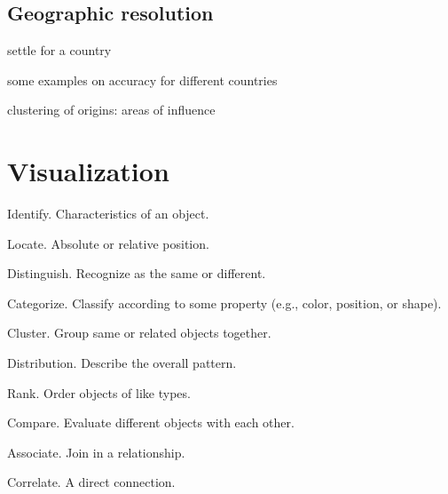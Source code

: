 

\subsection{Geographic resolution}\label{sub:resolution}

\begin{todos}
    \item settle for a country
    \item some examples on accuracy for different countries
    \item clustering of origins: areas of influence
\end{todos}


\section{Visualization}\label{sec:visualization}



\begin{todos}
    \item {}
    \item Identify. Characteristics of an object.
    \item Locate. Absolute or relative position.
    \item Distinguish. Recognize as the same or different.
    \item Categorize. Classify according to some property (e.g., color, position, or shape).
    \item Cluster. Group same or related objects together.
    \item Distribution. Describe the overall pattern.
    \item Rank. Order objects of like types.
    \item Compare. Evaluate different objects with each other.
    \item Associate. Join in a relationship.
    \item Correlate. A direct connection.
\end{todos}

